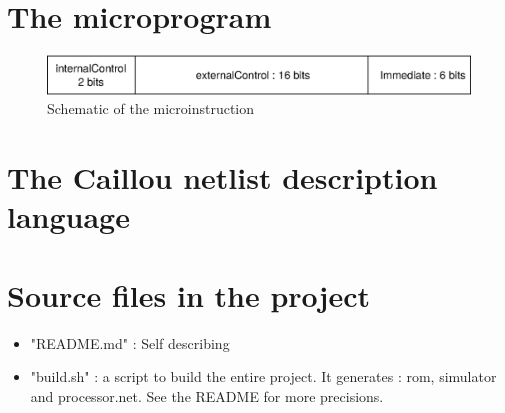 \documentclass[a4paper, 11pt]{article}
\begin{document}
\section{The microprogram}

\begin{figure}[h]
\center
\caption{Schematic of the microinstruction}
   \includegraphics[scale=0.5]{microInstr.eps}
\end{figure}


\section{The Caillou netlist description language}


\section{Source files in the project}
\begin{itemize}
\item "README.md" : Self describing
\item "build.sh" : a script to build the entire project. It generates : rom,
simulator and processor.net. See the README for more precisions.
\end{itemize}
\end{document}
